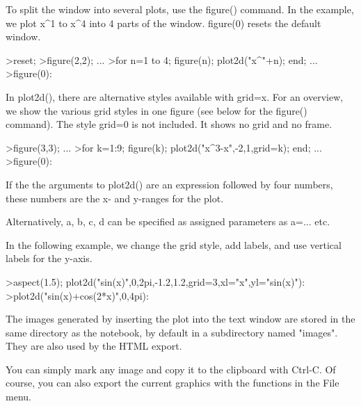 \documentclass[a4paper,10pt]{article}
\begin{document}
\begin{eulernotebook}
\begin{eulercomment}
\begin{eulercomment}
\begin{eulercomment}
\begin{eulercomment}
\begin{eulercomment}
To split the window into several plots, use the figure() command. In the example, we
plot x\textasciicircum{}1 to x\textasciicircum{}4 into 4 parts of the window. figure(0) resets the default window.
\end{eulercomment}
\begin{eulerprompt}
>reset;
>figure(2,2); ...
>for n=1 to 4; figure(n); plot2d("x^"+n); end; ...
>figure(0):
\end{eulerprompt}
\begin{eulercomment}
In plot2d(), there are alternative styles available with grid=x. For an overview, we
show the various grid styles in one figure (see below for the figure() command). The
style grid=0 is not included. It shows no grid and no frame.
\end{eulercomment}
\begin{eulerprompt}
>figure(3,3); ...
>for k=1:9; figure(k); plot2d("x^3-x",-2,1,grid=k); end; ...
>figure(0):
\end{eulerprompt}
\begin{eulercomment}
If the the arguments to plot2d() are an expression followed by four numbers, these
numbers are the x- and y-ranges for the plot.

Alternatively, a, b, c, d can be specified as assigned parameters as a=... etc.

In the following example, we change the grid style, add labels, and use vertical labels
for the y-axis.
\end{eulercomment}
\begin{eulerprompt}
>aspect(1.5); plot2d("sin(x)",0,2pi,-1.2,1.2,grid=3,xl="x",yl="sin(x)"):
>plot2d("sin(x)+cos(2*x)",0,4pi):
\end{eulerprompt}
\begin{eulercomment}
The images generated by inserting the plot into the text window are stored in the same
directory as the notebook, by default in a subdirectory named "images". They are also
used by the HTML export.

You can simply mark any image and copy it to the clipboard with Ctrl-C. Of course, you
can also export the current graphics with the functions in the File menu.


\end{eulercomment}
\end{eulercomment}
\end{eulercomment}
\end{eulercomment}
\end{eulercomment}
\end{eulernotebook}
\end{document}
